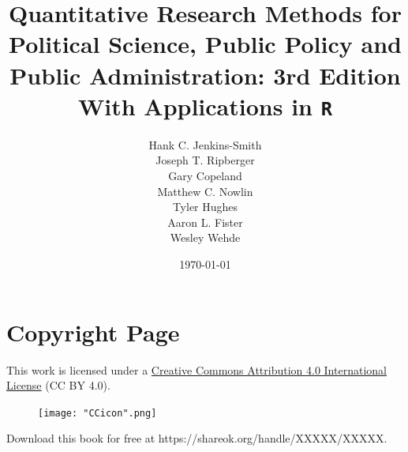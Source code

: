 \documentclass[11pt,openany]{book}\usepackage[]{graphicx}\usepackage[]{color}
\begin{document}


\title{Quantitative Research Methods for Political Science, Public Policy and Public Administration: 3rd Edition\\ 
  \large With Applications in \texttt{R}}
\author{Hank C. Jenkins-Smith\\ 
Joseph T. Ripberger\\
Gary Copeland\\
Matthew C. Nowlin\\
Tyler Hughes\\
Aaron L. Fister\\
Wesley Wehde}

\date{\today}

\maketitle



\newpage
\chapter*{Copyright Page}

This work is licensed under a \href{https://creativecommons.org/licenses/by/4.0/ }{Creative Commons Attribution 4.0 International License} (CC BY 4.0). 

\begin{figure}[h]
\texttt{[image: "CCicon".png]}
\label{fig:cc}
\end{figure}

Download this book for free at https://shareok.org/handle/XXXXX/XXXXX. 


{\singlespacing
  \tableofcontents
  
  \listoftables
  }





\newpage %
\end{document}
